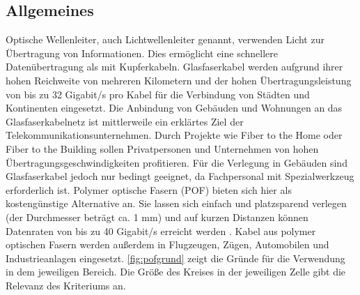 \subsection{Allgemeines}
\label{subsec:pofallgemeines}

Optische Wellenleiter, auch Lichtwellenleiter genannt, verwenden Licht zur
Übertragung von Informationen. Dies ermöglicht eine schnellere Datenübertragung
als mit Kupferkabeln. Glasfaserkabel werden aufgrund ihrer hohen Reichweite von
mehreren Kilometern und der hohen Übertragungsleistung von bis zu 32 Gigabit/s
pro Kabel für die Verbindung von Städten und Kontinenten eingesetzt. Die
Anbindung von Gebäuden und Wohnungen an das Glasfaserkabelnetz ist mittlerweile
ein erklärtes Ziel der Telekommunikationsunternehmen. Durch Projekte wie \glqq
Fiber to the Home\grqq{} oder \glqq Fiber to the Building\grqq{} sollen
Privatpersonen und Unternehmen von hohen Übertragungsgeschwindigkeiten
profitieren. Für die Verlegung in Gebäuden sind Glasfaserkabel jedoch nur
bedingt geeignet, da Fachpersonal mit Spezialwerkzeug erforderlich ist. Polymer
optische Fasern (POF) bieten sich hier als kostengünstige Alternative an. Sie
lassen sich einfach und platzsparend verlegen (der Durchmesser beträgt ca. 1 mm)
und auf kurzen Distanzen  können Datenraten von bis zu 40
Gigabit/s erreicht werden \cite{pofacgif}. Kabel aus polymer optischen Fasern
werden außerdem in Flugzeugen, Zügen, Automobilen und Industrieanlagen
eingesetzt. \autoref{fig:pofgrund} zeigt die Gründe für die Verwendung in dem
jeweiligen Bereich. Die Größe des Kreises in der jeweiligen Zelle gibt die
Relevanz des Kriteriums an. \cite{poflan}

